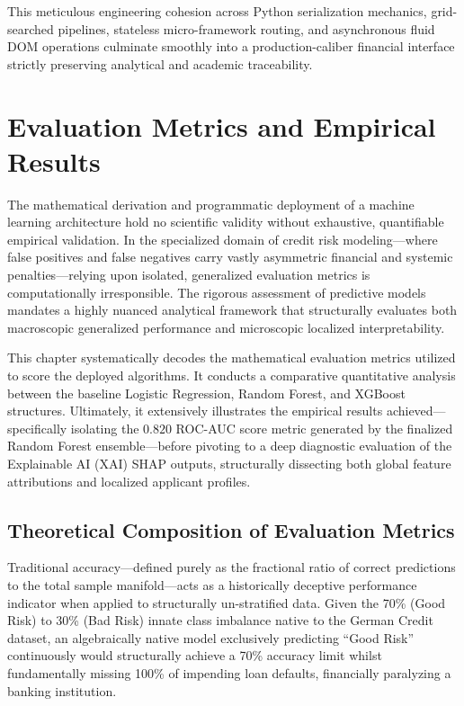 This meticulous engineering cohesion across Python serialization
mechanics, grid-searched pipelines, stateless micro-framework routing,
and asynchronous fluid DOM operations culminate smoothly into a
production-caliber financial interface strictly preserving analytical
and academic traceability.

\hypertarget{evaluation-metrics-and-empirical-results}{%
\section{Evaluation Metrics and Empirical
Results}\label{evaluation-metrics-and-empirical-results}}

The mathematical derivation and programmatic deployment of a machine
learning architecture hold no scientific validity without exhaustive,
quantifiable empirical validation. In the specialized domain of credit
risk modeling---where false positives and false negatives carry vastly
asymmetric financial and systemic penalties---relying upon isolated,
generalized evaluation metrics is computationally irresponsible. The
rigorous assessment of predictive models mandates a highly nuanced
analytical framework that structurally evaluates both macroscopic
generalized performance and microscopic localized interpretability.

This chapter systematically decodes the mathematical evaluation metrics
utilized to score the deployed algorithms. It conducts a comparative
quantitative analysis between the baseline Logistic Regression, Random
Forest, and XGBoost structures. Ultimately, it extensively illustrates
the empirical results achieved---specifically isolating the \(0.820\)
ROC-AUC score metric generated by the finalized Random Forest
ensemble---before pivoting to a deep diagnostic evaluation of the
Explainable AI (XAI) SHAP outputs, structurally dissecting both global
feature attributions and localized applicant profiles.

\hypertarget{theoretical-composition-of-evaluation-metrics}{%
\subsection{Theoretical Composition of Evaluation
Metrics}\label{theoretical-composition-of-evaluation-metrics}}

Traditional accuracy---defined purely as the fractional ratio of correct
predictions to the total sample manifold---acts as a historically
deceptive performance indicator when applied to structurally
un-stratified data. Given the 70\% (Good Risk) to 30\% (Bad Risk) innate
class imbalance native to the German Credit dataset, an algebraically
native model exclusively predicting ``Good Risk'' continuously would
structurally achieve a 70\% accuracy limit whilst fundamentally missing
100\% of impending loan defaults, financially paralyzing a banking
institution.


